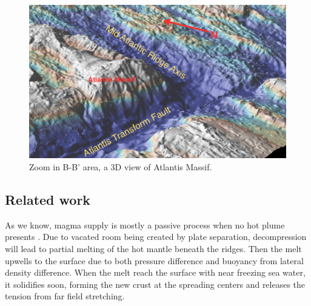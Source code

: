 \documentclass[12pt]{article}
\begin{document}
\begin{figure}[H]
 \centering
  \includegraphics[scale=0.4]{fig4_1.png}
 \caption{\small{Zoom in B-B' area, a 3D view of Atlantis Massif.}}
 \label{fig4_1}
\end{figure}

\subsection{Related work}
\label{ch:related}
As we know, magma supply is mostly a passive process when no hot plume presents \citep{Fowler2004}. Due to vacated room being created by plate separation, decompression will lead to partial melting of the hot mantle beneath the ridges. Then the melt upwells to the surface due to both pressure difference and buoyancy from lateral density difference. When the melt reach the surface with near freezing sea water, it solidifies soon, forming the new crust at the spreading centers and releases the tension from far field stretching. 
\end{document}
